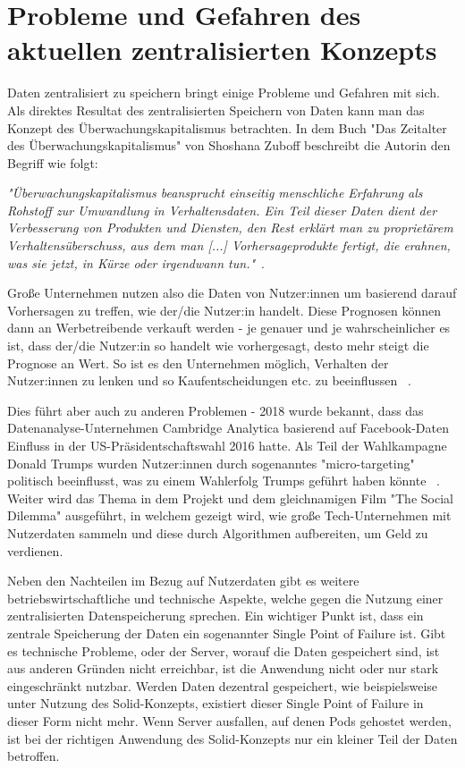 \documentclass[acmtog]{acmart}
\begin{document}
\label{section:problemeUndGefahrenDesAktuellenZentralisiertenKonzepts}
\section{Probleme und Gefahren des aktuellen zentralisierten Konzepts}
Daten zentralisiert zu speichern bringt einige Probleme und Gefahren mit sich. Als direktes Resultat des zentralisierten Speichern von Daten kann man das Konzept des Überwachungskapitalismus betrachten. In dem Buch "Das Zeitalter des Überwachungskapitalismus" von Shoshana Zuboff beschreibt die Autorin den Begriff wie folgt: 

\textit{"Überwachungskapitalismus beansprucht einseitig menschliche Erfahrung als Rohstoff zur Umwandlung in Verhaltensdaten. Ein Teil dieser Daten dient der Verbesserung von Produkten und Diensten, den Rest erklärt man zu proprietärem Verhaltensüberschuss, aus dem man [...] Vorhersageprodukte fertigt, die erahnen, was sie jetzt, in Kürze oder irgendwann tun."}~\cite{zuboff2018ueberwachungskapitalismus}.

Große Unternehmen nutzen also die Daten von Nutzer:innen um basierend darauf Vorhersagen zu treffen, wie der/die Nutzer:in handelt. Diese Prognosen können dann an Werbetreibende verkauft werden - je genauer und je wahrscheinlicher es ist, dass der/die Nutzer:in so handelt wie vorhergesagt, desto mehr steigt die Prognose an Wert. So ist es den Unternehmen möglich, Verhalten der Nutzer:innen zu lenken und so Kaufentscheidungen etc. zu beeinflussen ~\cite{zuboff2018ueberwachungskapitalismus}.

Dies führt aber auch zu anderen Problemen - 2018 wurde bekannt, dass das Datenanalyse-Unternehmen Cambridge Analytica basierend auf Facebook-Daten Einfluss in der US-Präsidentschaftswahl 2016 hatte. Als Teil der Wahlkampagne Donald Trumps wurden Nutzer:innen durch sogenanntes "micro-targeting" politisch beeinflusst, was zu einem Wahlerfolg Trumps geführt haben könnte ~\cite{isaak2018cambridgeanalytica}. Weiter wird das Thema in dem Projekt und dem gleichnamigen Film "The Social Dilemma" ausgeführt, in welchem gezeigt wird, wie große Tech-Unternehmen mit Nutzerdaten sammeln und diese durch Algorithmen aufbereiten, um Geld zu verdienen.

Neben den Nachteilen im Bezug auf Nutzerdaten gibt es weitere betriebswirtschaftliche und technische Aspekte, welche gegen die Nutzung einer zentralisierten Datenspeicherung sprechen. Ein wichtiger Punkt ist, dass ein zentrale Speicherung der Daten ein sogenannter Single Point of Failure ist. Gibt es technische Probleme, oder der Server, worauf die Daten gespeichert sind, ist aus anderen Gründen nicht erreichbar, ist die Anwendung nicht oder nur stark eingeschränkt nutzbar. Werden Daten dezentral gespeichert, wie beispielsweise unter Nutzung des Solid-Konzepts, existiert dieser Single Point of Failure in dieser Form nicht mehr. Wenn Server ausfallen, auf denen Pods gehostet werden, ist bei der richtigen Anwendung des Solid-Konzepts nur ein kleiner Teil der Daten betroffen.
\end{document}
